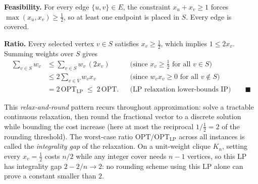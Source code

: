 \begin{whybox}
\textbf{Feasibility.} For every edge $\{u,v\}\in E$, the constraint $x_u+x_v\ge 1$ forces
$\max(x_u,x_v)\ge \tfrac12$, so at least one endpoint is placed in $S$. Every edge is covered.

\textbf{Ratio.} Every selected vertex $v\in S$ satisfies $x_v\ge\tfrac12$, which implies $1 \le 2x_v$.
Summing weights over $S$ gives
\begin{align*}
  \sum_{v\in S} w_v &\le \sum_{v\in S} w_v\,(2x_v) && \text{(since $x_v \ge \tfrac12$ for all $v\in S$)} \\
  &\le 2\sum_{v\in V} w_v x_v && \text{(since $w_v x_v \ge 0$ for all $v\notin S$)} \\
  &= 2\,\mathrm{OPT}_{\mathrm{LP}} \;\le\; 2\,\mathrm{OPT}. && \text{(LP relaxation lower-bounds IP)} \qquad\blacksquare
\end{align*}
\end{whybox}

This \emph{relax-and-round} pattern recurs throughout approximation: solve a tractable continuous
relaxation, then round the fractional vector to a discrete solution while bounding the cost increase
(here at most the reciprocal $1/\tfrac12 = 2$ of the rounding threshold). The worst-case ratio
$\mathrm{OPT}/\mathrm{OPT}_{\mathrm{LP}}$ across all instances is called the \emph{integrality gap} of
the relaxation. On a unit-weight clique $K_n$, setting every $x_v = \tfrac12$ costs $n/2$ while any
integer cover needs $n-1$ vertices, so this LP has integrality gap $2 - 2/n \to 2$: no rounding scheme
using this LP alone can prove a constant smaller than $2$.

